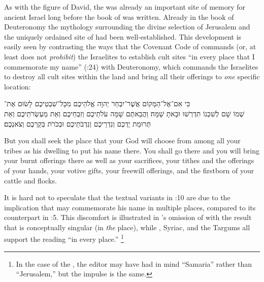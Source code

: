 As with the figure of David, the \jerusalemtemple was already an important site of memory for ancient Israel long before the book of \chronicles was written. Already in the book of Deuteronomy the mythology surrounding the divine selection of Jerusalem and the uniquely ordained site of \solomonstemple had been well-established. This development is easily seen by contrasting the ways that the Covenant Code of  commands (or, at least does not \emph{prohibit}) the Israelites to establish cult sites  ``in every place that I commemorate my name'' (:24) with Deuteronomy, which commands the Israelites to destroy all cult sites within the land and bring all their offerings to \emph{one} specific location: 
\begin{hebrewtext}
    כִּי אִם־אֶל־הַמָּקוֹם אֲשֶׁר־יִבְחַר יְהוָה אֱלֹהֵיכֶם מִכָּל־שִׁבְטֵיכֶם לָשׂוּם אֶת־\\שְׁמוֹ שָׁם לְשִׁכְנוֹ תִדְרְשׁוּ וּבָאתָ שָׁמָּה׃
    וַהֲבֵאתֶם שָׁמָּה עֹלֹתֵיכֶם וְזִבְחֵיכֶם וְאֵת מַעְשְׂרֹתֵיכֶם וְאֵת תְּרוּמַת יֶדְכֶם וְנִדְרֵיכֶם וְנִדְבֹתֵיכֶם וּבְכֹרֹת בְּקַרְכֶם וְצֹאנְכֶם׃
\end{hebrewtext}
\begin{translation}
    But you shall seek the place that \yahweh your God will choose from among all your tribes as his dwelling to put his name there. You shall go there
    and you will bring your burnt offerings there as well as your sacrifices, your tithes and the offerings of your hands, your votive gifts, your freewill offerings, and the firstborn of your cattle and flocks. 
\end{translation}
\noindent
It is hard not to speculate that the textual variants in :10 are due to the implication that \yahweh may commemorate his name in multiple places, compared to its counterpart in :5. This discomfort is illustrated in  \sampent's omission of  with the result that  is conceptually singular (in \emph{the} place), while \lxx, Syriac, and the Targums all support the reading ``in every place.''%
    \footnote{In the case of the \sampent, the editor may have had in mind ``Samaria'' rather than ``Jerusalem,'' but the impulse is the same.}
